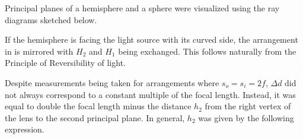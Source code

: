 \begin{paper}
		
	
	Principal planes of a hemisphere and a sphere were visualized using the ray diagrams sketched below.
	
	
	If the hemisphere is facing the light source with its curved side, the arrangement in \figHemisphere is mirrored with \( H_2 \) and \( H_1 \) being exchanged. This follows naturally from the Principle of Reversibility of light. 
	
	
	Despite measurements being taken for arrangements where \( s_o = s_i = 2f \), \( \Delta d \) did not always correspond to a constant multiple of the focal length. Instead, it was equal to double the focal length minus the distance \( h_2 \) from the right vertex of the lens to the second principal plane. In general, \( h_2 \) was given by the following expression.
	

\end{paper}
